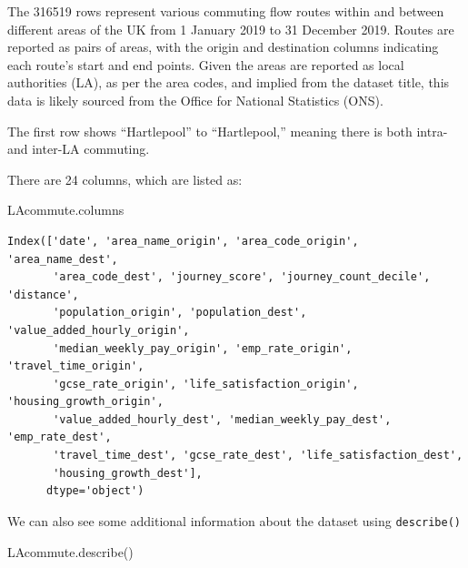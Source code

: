 \documentclass[
  number]{elsarticle}
\newenvironment{Shaded}{\begin{snugshade}}{\end{snugshade}}
\newcommand{\NormalTok}[1]{\textcolor[rgb]{0.00,0.23,0.31}{#1}}
\begin{document}
The 316519 rows represent various commuting flow routes within and
between different areas of the UK from 1 January 2019 to 31 December
2019. Routes are reported as pairs of areas, with the origin and
destination columns indicating each route's start and end points. Given
the areas are reported as local authorities (LA), as per the area codes,
and implied from the dataset title, this data is likely sourced from the
Office for National Statistics (ONS).

The first row shows ``Hartlepool'' to ``Hartlepool,'' meaning there is
both intra- and inter-LA commuting.

There are 24 columns, which are listed as:

\begin{Shaded}
\begin{Highlighting}[]
\NormalTok{LAcommute.columns}
\end{Highlighting}
\end{Shaded}

\begin{verbatim}
Index(['date', 'area_name_origin', 'area_code_origin', 'area_name_dest',
       'area_code_dest', 'journey_score', 'journey_count_decile', 'distance',
       'population_origin', 'population_dest', 'value_added_hourly_origin',
       'median_weekly_pay_origin', 'emp_rate_origin', 'travel_time_origin',
       'gcse_rate_origin', 'life_satisfaction_origin', 'housing_growth_origin',
       'value_added_hourly_dest', 'median_weekly_pay_dest', 'emp_rate_dest',
       'travel_time_dest', 'gcse_rate_dest', 'life_satisfaction_dest',
       'housing_growth_dest'],
      dtype='object')
\end{verbatim}

We can also see some additional information about the dataset using
\texttt{describe()}

\begin{Shaded}
\begin{Highlighting}[]
\NormalTok{LAcommute.describe()}
\end{Highlighting}
\end{Shaded}
\end{document}

